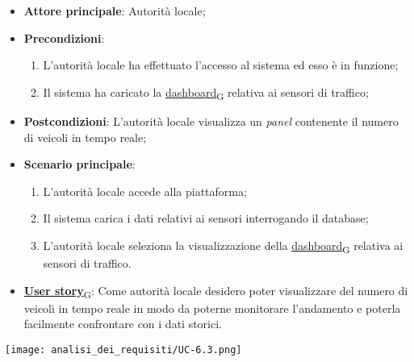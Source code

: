\begin{itemize}
	\item \textbf{Attore principale}: Autorità locale;
	\item \textbf{Precondizioni}:
	      \begin{enumerate}
		      \item L'autorità locale ha effettuato l'accesso al sistema ed esso è in funzione;
		      \item Il sistema ha caricato la \href{https://7last.github.io/docs/rtb/documentazione-interna/glossario\#dashboard}{dashboard\textsubscript{G}} relativa ai sensori di traffico;
	      \end{enumerate}
	\item \textbf{Postcondizioni}: L'autorità locale visualizza un \textit{panel} contenente il numero di veicoli in tempo reale;
	\item \textbf{Scenario principale}:
	      \begin{enumerate}
		      \item L'autorità locale accede alla piattaforma;
		      \item Il sistema carica i dati relativi ai sensori interrogando il database;
		      \item L'autorità locale seleziona la visualizzazione della \href{https://7last.github.io/docs/rtb/documentazione-interna/glossario\#dashboard}{dashboard\textsubscript{G}} relativa ai sensori di traffico.
	      \end{enumerate}
	\item \href{https://7last.github.io/docs/rtb/documentazione-interna/glossario\#user-story}{\textbf{User story}\textsubscript{G}}:
	      Come autorità locale desidero poter visualizzare del numero di veicoli in tempo reale in modo da poterne monitorare l'andamento
	      e poterla facilmente confrontare con i dati storici.
\end{itemize}
\begin{center}
	\texttt{[image: analisi\_dei\_requisiti/UC-6.3.png]}
\end{center}

